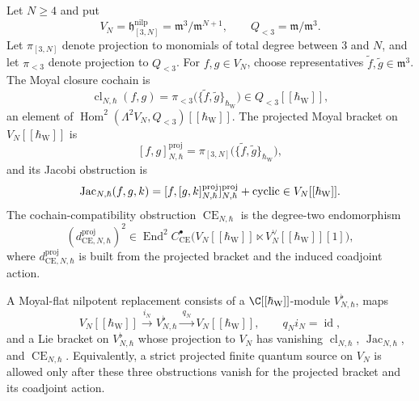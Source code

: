 \begin{defn}
\label{defn:nilpotent-moyal-flat-datum}
Let \(N\geq4\) and put
\[
  V_N=\mathfrak h^{\mathrm{nilp}}_{[3,N]}
  =\mathfrak m^3/\mathfrak m^{N+1},\qquad
  Q_{<3}=\mathfrak m/\mathfrak m^3 .
\]
Let \(\pi_{[3,N]}\) denote projection to monomials of total degree
between \(3\) and \(N\), and let \(\pi_{<3}\) denote projection to
\(Q_{<3}\).  For \(f,g\in V_N\), choose representatives
\(\tilde f,\tilde g\in\mathfrak m^3\).  The Moyal closure cochain is
\[
  \operatorname{cl}_{N,\hbar}(f,g)
  =
  \pi_{<3}\bigl(\{\tilde f,\tilde g\}_{\hbar_{\mathrm{W}}}\bigr)
  \in Q_{<3}[[\hbar_{\mathrm{W}}]],
\]
an element of
\(\operatorname{Hom}^2(\Lambda^2V_N,Q_{<3})[[\hbar_{\mathrm{W}}]]\).
The projected Moyal bracket on \(V_N[[\hbar_{\mathrm{W}}]]\) is
\[
  [f,g]^{\operatorname{proj}}_{N,\hbar}
  =
  \pi_{[3,N]}\bigl(\{\tilde f,\tilde g\}_{\hbar_{\mathrm{W}}}\bigr),
\]
and its Jacobi obstruction is
\[
  \operatorname{Jac}_{N,\hbar}(f,g,k)
  =
  [f,[g,k]^{\operatorname{proj}}_{N,\hbar}]^{\operatorname{proj}}_{N,\hbar}
  +\textup{cyclic}
  \in V_N[[\hbar_{\mathrm{W}}]] .
\]
The cochain-compatibility obstruction
\(\operatorname{CE}_{N,\hbar}\) is the degree-two endomorphism
\[
  (d^{\operatorname{proj}}_{\mathrm{CE},N,\hbar})^2
  \in
  \operatorname{End}^2
  C^\bullet_{\mathrm{CE}}\bigl(
    V_N[[\hbar_{\mathrm{W}}]]
    \ltimes V_N^\vee[[\hbar_{\mathrm{W}}]][1]\bigr),
\]
where \(d^{\operatorname{proj}}_{\mathrm{CE},N,\hbar}\) is built from
the projected bracket and the induced coadjoint action.

A Moyal-flat nilpotent replacement consists of a
\(\C[[\hbar_{\mathrm{W}}]]\)-module \(V^{\flat}_{N,\hbar}\), maps
\[
  V_N[[\hbar_{\mathrm{W}}]]
  \xrightarrow{\ i_N\ }
  V^{\flat}_{N,\hbar}
  \xrightarrow{\ q_N\ }
  V_N[[\hbar_{\mathrm{W}}]],
  \qquad q_Ni_N=\operatorname{id},
\]
and a Lie bracket on \(V^{\flat}_{N,\hbar}\) whose projection to
\(V_N\) has vanishing
\(\operatorname{cl}_{N,\hbar}\), \(\operatorname{Jac}_{N,\hbar}\), and
\(\operatorname{CE}_{N,\hbar}\).  Equivalently, a strict projected
finite quantum source on \(V_N\) is allowed only after these three
obstructions vanish for the projected bracket and its coadjoint action.
\end{defn}

